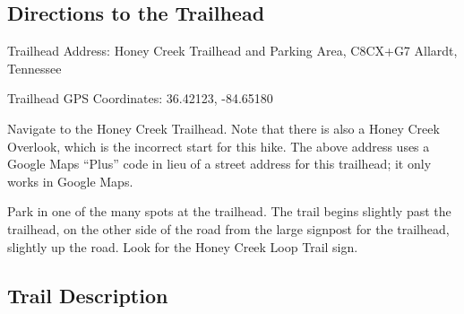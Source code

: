 \documentclass[
  letterpaper,
  DIV=11,
  numbers=noendperiod]{scrreprt}
\begin{document}
\subsection{Directions to the
Trailhead}\label{directions-to-the-trailhead-17}

Trailhead Address: Honey Creek Trailhead and Parking Area, C8CX+G7
Allardt, Tennessee

Trailhead GPS Coordinates: 36.42123, -84.65180

Navigate to the Honey Creek Trailhead. Note that there is also a Honey
Creek Overlook, which is the incorrect start for this hike. The above
address uses a Google Maps ``Plus'' code in lieu of a street address for
this trailhead; it only works in Google Maps.

Park in one of the many spots at the trailhead. The trail begins
slightly past the trailhead, on the other side of the road from the
large signpost for the trailhead, slightly up the road. Look for the
Honey Creek Loop Trail sign.

\subsection{Trail Description}\label{trail-description-18}
\end{document}
